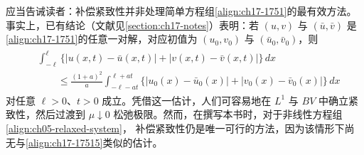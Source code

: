 \documentclass[../../main.tex]{subfiles}
\begin{document}
应当告诫读者：补偿紧致性并非处理简单方程组\eqref{align:ch17-1751}的最有效方法。事实上，已有结论（文献见\cref{section:ch17-notes}）表明：若 $(u,v)$ 与 $(\bar u,\bar v)$ 是\eqref{align:ch17-1751}的任意一对解，对应初值为 $(u_0,v_0)$ 与 $(\bar u_0,\bar v_0)$，则
\begin{align}
\begin{split}
&\int_{-\ell}^{\ell}\{|u(x,t)-\bar u(x,t)|+|v(x,t)-\bar v(x,t)|\}\,dx\\
&\qquad\leqslant\frac{(1+a)^2}{a}\int_{-\ell-at}^{\ell+at}\{|u_0(x)-\bar u_0(x)|+|v_0(x)-\bar v_0(x)|\}\,dx
\end{split}
\label{align:ch17-17515}
\end{align}
对任意 $\ell>0$、$t>0$ 成立。凭借这一估计，人们可容易地在 $L^1$ 与 $BV$ 中确立紧致性，然后过渡到 $\mu\downarrow0$ 松弛极限。然而，在撰写本书时，对于非线性方程组\eqref{align:ch05-relaxed-system}，
补偿紧致性仍是唯一可行的方法，因为该情形下尚无与\eqref{align:ch17-17515}类似的估计。
\end{document}
